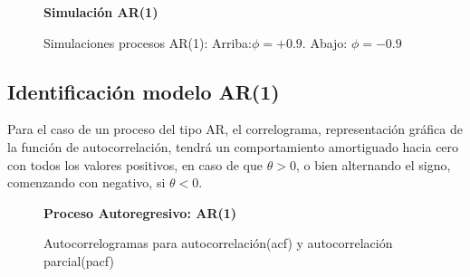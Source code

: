 \begin{figure}[h]
	\centering
	\textbf{Simulación AR(1)}\par\medskip
	\caption{Simulaciones procesos AR(1): Arriba:$\phi=+0.9$.  Abajo: $\phi=-0.9$}\label{fig6}
\end{figure}


\subsection{Identificaci\'on modelo AR(1)}

Para el caso de un proceso del tipo AR, el correlograma, representaci\'on gr\'afica de la funci\'on de autocorrelaci\'on, tendr\'a un
comportamiento amortiguado hacia cero con todos los valores positivos, en caso de que $\theta > 0$, o bien alternando el signo, comenzando con negativo, si  $\theta < 0$.

\begin{figure}[h]
	\centering
	\textbf{Proceso Autoregresivo: AR(1)}\par\medskip
	\caption{Autocorrelogramas para autocorrelación(acf) y autocorrelación parcial(pacf)}\label{fig7}
\end{figure}


